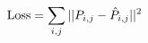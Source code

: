\documentclass[preview]{standalone}
\begin{document}
\begin{align*}
\special{dvisvgm:raw <g id='unique000'>}\text{Loss} = \sum_{i,j} || P_{i,j} - \hat{P}_{i,j} ||^2\special{dvisvgm:raw </g>}
\end{align*}
\end{document}
